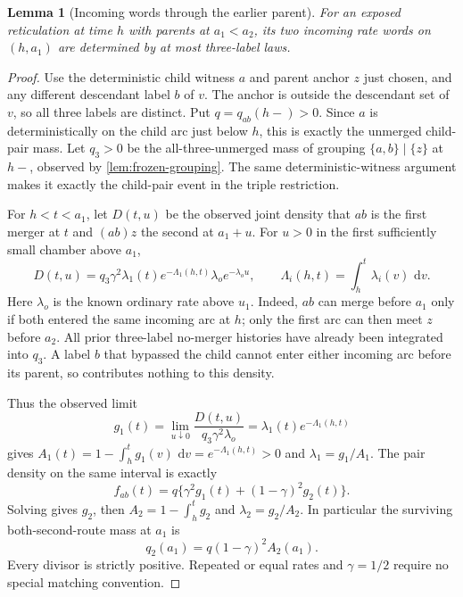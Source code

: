 \documentclass[11pt]{article}
\newtheorem{lemma}[theorem]{Lemma}
\newcommand{\dd}{\,\mathrm d}
\begin{document}
\begin{lemma}[Incoming words through the earlier parent]
\label{lem:incoming-first}
For an exposed reticulation at time $h$ with parents at $a_1<a_2$, its two
incoming rate words on $(h,a_1)$ are determined by at most three-label laws.
\end{lemma}
\begin{proof}
Use the deterministic child witness $a$ and parent anchor $z$ just chosen,
and any different descendant label $b$ of $v$.  The anchor is outside the
descendant set of $v$, so all three labels are distinct.  Put
$q=q_{ab}(h-)>0$.  Since $a$ is deterministically on the child arc just
below $h$, this is exactly the unmerged child-pair mass.  Let $q_3>0$ be the
all-three-unmerged mass of grouping $\{a,b\}\mid\{z\}$ at $h-$, observed
by \cref{lem:frozen-grouping}.  The same deterministic-witness argument
makes it exactly the child-pair event in the triple restriction.

For $h<t<a_1$, let $D(t,u)$ be the observed joint density that $ab$ is the
first merger at $t$ and $(ab)z$ the second at $a_1+u$.  For $u>0$ in the
first sufficiently small chamber above $a_1$,
\[
 D(t,u)=q_3\gamma^2\lambda_1(t)e^{-\Lambda_1(h,t)}
           \lambda_o e^{-\lambda_o u},
 \qquad \Lambda_i(h,t)=\int_h^t\lambda_i(v)\,\dd v.
\]
Here $\lambda_o$ is the known ordinary rate above $u_1$.  Indeed, $ab$
can merge before $a_1$ only if both entered the same incoming arc at $h$;
only the first arc can then meet $z$ before $a_2$.  All prior three-label
no-merger histories have already been integrated into $q_3$.  A label $b$
that bypassed the child cannot enter either incoming arc before its parent,
so contributes nothing to this density.

Thus the observed limit
\[
 g_1(t)=\lim_{u\downarrow0}\frac{D(t,u)}{q_3\gamma^2\lambda_o}
       =\lambda_1(t)e^{-\Lambda_1(h,t)}
\]
gives $A_1(t)=1-\int_h^t g_1(v)\,\dd v=e^{-\Lambda_1(h,t)}>0$ and
$\lambda_1=g_1/A_1$.  The pair density on the same interval is exactly
\[
 f_{ab}(t)=q\{\gamma^2g_1(t)+(1-\gamma)^2g_2(t)\}.
\]
Solving gives $g_2$, then $A_2=1-\int_h^t g_2$ and $\lambda_2=g_2/A_2$.
In particular the surviving both-second-route mass at $a_1$ is
\[
 q_2(a_1)=q(1-\gamma)^2 A_2(a_1).
\]
Every divisor is strictly positive.  Repeated or equal rates and
$\gamma=1/2$ require no special matching convention.
\end{proof}
\end{document}
